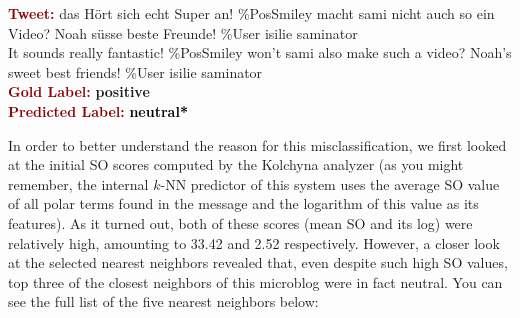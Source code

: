 \begin{example}\label{snt:cgsa:exmp:kolchyna-error-0}
  \noindent\textup{\bfseries\textcolor{darkred}{Tweet:}} {\upshape
    das H\"ort sich echt Super an! \%PosSmiley macht sami nicht auch so ein Video? Noah s\"usse beste Freunde! \heart \%User isilie saminator}\\
  \noindent It sounds really fantastic! \%PosSmiley won't sami also make such a video? Noah's sweet best friends! \heart \%User isilie saminator\\[0.65em]
  \noindent\textup{\bfseries\textcolor{darkred}{Gold Label:}}\hspace*{4.3em}\textbf{%
    \upshape\textcolor{green3}{positive}}\\
 \noindent\textup{\bfseries\textcolor{darkred}{Predicted Label:}}\hspace*{2em}\textbf{%
    \upshape\textcolor{black}{neutral*}}\\
\end{example}

\noindent In order to better understand the reason for this
misclassification, we first looked at the initial SO scores computed
by the Kolchyna analyzer (as you might remember, the internal $k$-NN
predictor of this system uses the average SO value of all polar terms
found in the message and the logarithm of this value as its features).
As it turned out, both of these scores (mean SO and its log) were
relatively high, amounting to 33.42 and 2.52 respectively.  However, a
closer look at the selected nearest neighbors revealed that, even
despite such high SO values, top three of the closest neighbors of
this microblog were in fact neutral.  You can see the full list of the
five nearest neighbors below:

